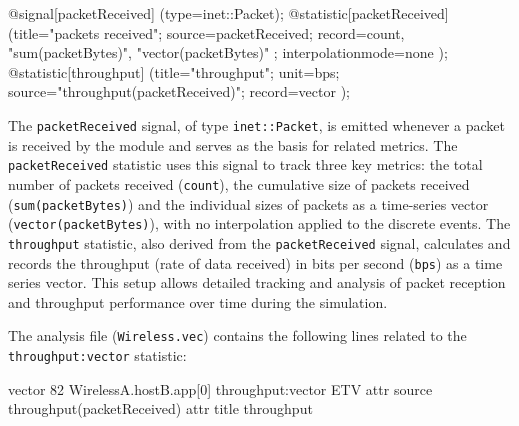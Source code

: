 \documentclass[
  letterpaper,
  DIV=11,
  numbers=noendperiod]{scrartcl}
\newenvironment{Shaded}{\begin{snugshade}}{\end{snugshade}}
\newcommand{\NormalTok}[1]{\textcolor[rgb]{0.00,0.23,0.31}{#1}}
\newcommand{\OperatorTok}[1]{\textcolor[rgb]{0.37,0.37,0.37}{#1}}
\newcommand{\StringTok}[1]{\textcolor[rgb]{0.13,0.47,0.30}{#1}}
\begin{document}
\begin{Shaded}
\begin{Highlighting}[]
\NormalTok{@signal[packetReceived]}
\NormalTok{  (type}\OperatorTok{=}\NormalTok{inet}\OperatorTok{::}\NormalTok{Packet)}\OperatorTok{;}
\NormalTok{@statistic[packetReceived]}
\NormalTok{  (title}\OperatorTok{=}\StringTok{"packets received"}\OperatorTok{;}
\NormalTok{    source}\OperatorTok{=}\NormalTok{packetReceived}\OperatorTok{;}
\NormalTok{    record}\OperatorTok{=}\NormalTok{count}\OperatorTok{,}
      \StringTok{"sum(packetBytes)"}\OperatorTok{,}
      \StringTok{"vector(packetBytes)"}
    \OperatorTok{;}
\NormalTok{    interpolationmode}\OperatorTok{=}\NormalTok{none}
\NormalTok{  )}\OperatorTok{;}
\NormalTok{@statistic[throughput]}
\NormalTok{  (title}\OperatorTok{=}\StringTok{"throughput"}\OperatorTok{;}
\NormalTok{    unit}\OperatorTok{=}\NormalTok{bps}\OperatorTok{;}
\NormalTok{    source}\OperatorTok{=}\StringTok{"throughput(packetReceived)"}\OperatorTok{;}
\NormalTok{    record}\OperatorTok{=}\NormalTok{vector}
\NormalTok{  )}\OperatorTok{;}
\end{Highlighting}
\end{Shaded}

The \texttt{packetReceived} signal, of type \texttt{inet::Packet}, is
emitted whenever a packet is received by the module and serves as the
basis for related metrics. The \texttt{packetReceived} statistic uses
this signal to track three key metrics: the total number of packets
received (\texttt{count}), the cumulative size of packets received
(\texttt{sum(packetBytes)}) and the individual sizes of packets as a
time-series vector (\texttt{vector(packetBytes)}), with no interpolation
applied to the discrete events. The \texttt{throughput} statistic, also
derived from the \texttt{packetReceived} signal, calculates and records
the throughput (rate of data received) in bits per second (\texttt{bps})
as a time series vector. This setup allows detailed tracking and
analysis of packet reception and throughput performance over time during
the simulation.

The analysis file (\texttt{Wireless.vec}) contains the following lines
related to the \texttt{throughput:vector} statistic:

\begin{Shaded}
\begin{Highlighting}[]
\NormalTok{vector 82 WirelessA.hostB.app[0]}
\NormalTok{  throughput:vector ETV}
\NormalTok{attr source throughput(packetReceived)}
\NormalTok{attr title throughput}
\end{Highlighting}
\end{Shaded}
\end{document}

